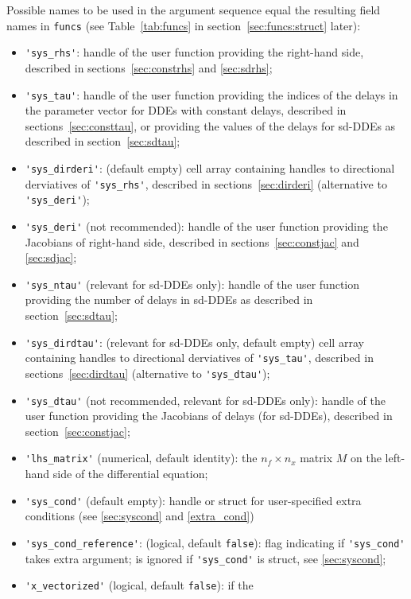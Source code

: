 \documentclass[10pt]{scrartcl}
\newcommand{\blist}[1]{\mbox{\lstinline!#1!}}
\begin{document}
Possible names to be used in the argument sequence
equal the resulting field names in \blist{funcs} (see
Table~\ref{tab:funcs} in section~\ref{sec:funcs:struct} later):
\begin{itemize}
\item \blist{'sys_rhs'}: handle of the user function providing the
  right-hand side, described in sections~\ref{sec:constrhs} and
  \ref{sec:sdrhs};
\item \blist{'sys_tau'}: handle of the user function providing the
  indices of the delays in the parameter vector for DDEs with constant
  delays, described in sections~\ref{sec:consttau}, or providing the
  values of the delays for sd-DDEs as described in
  section~\ref{sec:sdtau};
\item \blist{'sys_dirderi'}: (default empty) cell array containing
  handles to directional derviatives of \blist{'sys_rhs'}, described
  in sections~\ref{sec:dirderi} (alternative to \blist{'sys_deri'});
\item \blist{'sys_deri'} (not recommended): handle of the user function providing the
  Jacobians of right-hand side, described in
  sections~\ref{sec:constjac} and \ref{sec:sdjac};
\item \blist{'sys_ntau'} (relevant for sd-DDEs only): handle of the
  user function providing the number of delays in sd-DDEs as described
  in section~\ref{sec:sdtau};
\item \blist{'sys_dirdtau'}: (relevant for sd-DDEs only, default empty)
  cell array containing handles to directional derviatives of
  \blist{'sys_tau'}, described in sections~\ref{sec:dirdtau}
  (alternative to \blist{'sys_dtau'});
\item \blist{'sys_dtau'} (not recommended, relevant for sd-DDEs only): handle of the user
  function providing the Jacobians of delays (for sd-DDEs), described
  in section~\ref{sec:constjac};
\item \blist{'lhs_matrix'} (numerical, default identity): the
  $n_f\times n_x$ matrix $M$ on the left-hand side of the differential equation;
\item \blist{'sys_cond'} (default empty): handle or struct for user-specified extra conditions
  (see \cref{sec:syscond} and \cref{extra_cond})
\item \blist{'sys_cond_reference'}: (logical, default \blist{false}):
  flag indicating if \blist{'sys_cond'} takes extra argument; is ignored if \blist{'sys_cond'} is struct, see \cref{sec:syscond};
\item \blist{'x_vectorized'} (logical, default \blist{false}): if the

\end{itemize}
\end{document}

